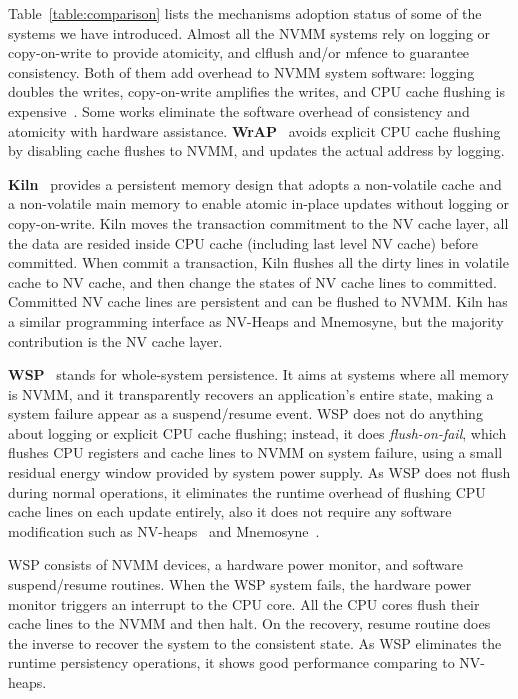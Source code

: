 Table~\ref{table:comparison} lists the mechanisms adoption status of some
of the systems we have introduced.
Almost all the NVMM systems rely on logging or
copy-on-write to provide atomicity, and clflush and/or mfence to guarantee
consistency. Both of them add overhead to NVMM system software: logging doubles
the writes, copy-on-write amplifies the writes, and CPU cache flushing is
expensive~\cite{CPUcaching}. Some works eliminate the software overhead of
consistency and atomicity with hardware assistance.
\textbf{WrAP}~\cite{WrAP} avoids explicit CPU cache flushing by disabling
cache flushes to NVMM, and updates the actual address by logging.

\textbf{Kiln}~\cite{Kiln} provides a persistent memory design
 that adopts a non-volatile
cache and a non-volatile main memory to enable atomic in-place updates without
logging or copy-on-write. Kiln moves the transaction commitment to the NV
cache layer, all the data are resided inside CPU cache (including last level
NV cache) before committed. When commit a transaction, Kiln flushes all
the dirty lines in volatile cache to NV cache, and then change the states of
NV cache lines to committed. Committed NV cache lines are persistent and
can be flushed to NVMM. Kiln has a similar programming interface as NV-Heaps
and Mnemosyne, but the majority contribution is the NV cache layer.

\textbf{WSP}~\cite{WSP} stands for whole-system persistence.
 It aims at systems where
all memory is NVMM, and it transparently recovers an application's entire state,
making a system failure appear as a suspend/resume event. WSP does not
do anything about logging or explicit CPU cache flushing; instead, it does 
\emph{flush-on-fail}, which flushes CPU registers and cache lines to NVMM
on system failure, using a small residual energy window provided by system
power supply. As WSP does not flush during normal operations, it eliminates
the runtime overhead of flushing CPU cache lines on each update entirely, also
it does not require any software modification such as NV-heaps~\cite{nvheaps}
 and Mnemosyne~\cite{mnemosyne}.

WSP consists of NVMM devices, a hardware power monitor, and software suspend/resume routines. When the WSP system fails, the hardware power monitor triggers
an interrupt to the CPU core. All the CPU cores flush their cache lines to the 
NVMM and then halt. On the recovery, resume routine does the inverse to recover
the system to the consistent state. As WSP eliminates the runtime persistency
operations, it shows good performance comparing to NV-heaps.

